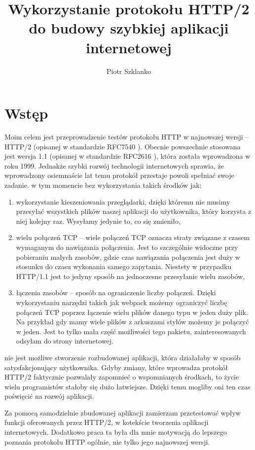 \documentclass[a4paper,12pt,twoside,openany]{report}
\title{Wykorzystanie protokołu HTTP/2 do budowy szybkiej aplikacji internetowej}
\author{Piotr Szklanko}
\begin{document}
\maketitle

\chapter{Wstęp}
Moim celem jest przeprowadzenie testów protokołu HTTP w najnowszej wersji -- HTTP/2 (opisanej w standardzie RFC7540 \cite{RFC7540}).
Obecnie powszechnie stosowana jest wersja 1.1 (opisanej w standardzie RFC2616 \cite{RFC2616}), która została wprowadzona w roku 1999.
Jednakże szybki rozwój technologii internetowych sprawia, że wprowadzony osiemnaście lat temu protokół przestaje powoli spełniać swoje zadanie.
w tym momencie bez wykorzystania takich środków jak:
\begin{enumerate}
	\item wykorzystanie kieszeniowania przeglądarki, dzięki któremu nie musimy przesyłać wszystkich plików naszej aplikacji do użytkownika, który korzysta z niej kolejny raz. 
	Wysyłamy jedynie to, co się zmieniło,
	\item wielu połączeń TCP -- wiele połączeń TCP oznacza straty związane z czasem wymaganym do nawiązania połączenia\cite{connectionMng}.
	Jest to szczególnie widoczne przy pobieraniu małych zasobów, gdzie czas nawiązania połączenia jest duży w stosunku do czasu wykonania samego zapytania.
	Niestety w przypadku HTTP/1.1 jest to jedyny sposób na jednoczesne przesyłanie wielu zasobów,
	\item łączenia zasobów -- sposób na ograniczenie liczby połączeń.
	Dzięki wykorzystaniu narzędzi takich jak webpack możemy ograniczyć liczbę połączeń TCP poprzez łączenie wielu plików danego typu w jeden duży plik.
	Na przykład gdy mamy wiele plików z arkuszami stylów możemy je połączyć w jeden.
	Jest to tylko mała część możliwości tego pakietu, zainteresowanych odsyłam do strony internetowej\cite{webpack}.
\end{enumerate}
nie jest możliwe stworzenie rozbudowanej aplikacji, która działałaby w sposób satysfakcjonujący użytkownika.
Gdyby zmiany, które wprowadza protokół HTTP/2 faktycznie pozwalały zapomnieć o wspomnianych środkach, to życie wielu programistów stałoby się dużo łatwiejsze.
Dzięki temu mogliby oni ten czas poświęcić na rozwój aplikacji.

Za pomocą samodzielnie zbudowanej aplikacji zamierzam przetestować wpływ funkcji oferowanych przez HTTP/2, w kotekście tworzenia aplikacji internetowych.
Dodatkowo praca ta była dla mnie motywacją do lepszego poznania protokołu HTTP ogólnie, nie tylko jego najnowszej wersji.
\end{document}
